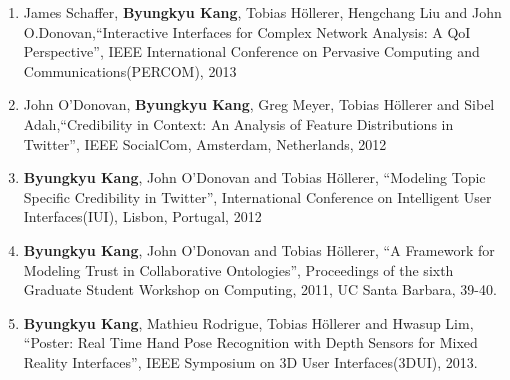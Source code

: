 \documentclass[10pt]{article}
\makeatletter
\newlength{\bibhang}
\newlength{\bibsep}
 {\@listi \global\bibsep\itemsep \global\advance\bibsep by\parsep}
\newenvironment{bibsection}%
        {\begin{enumerate}{}{%
       \setlength{\leftmargin}{\bibhang}%
       \setlength{\itemindent}{-\leftmargin}%
       \setlength{\itemsep}{\bibsep}%
       \setlength{\parsep}{\z@}%
        \setlength{\partopsep}{0pt}%
        \setlength{\topsep}{0pt}}}
        {\end{enumerate}\vspace{-.6\baselineskip}}
\makeatother
\begin{document}
\begin{bibsection}
   \item[--] James Schaffer, {\bf Byungkyu Kang}, Tobias H{\"o}llerer, Hengchang Liu and John O.Donovan,``Interactive Interfaces for Complex Network Analysis: A QoI Perspective'', IEEE International Conference on Pervasive Computing and Communications(PERCOM), 2013
   
   \item[--] John O'Donovan, {\bf Byungkyu Kang}, Greg Meyer, Tobias H{\"o}llerer and Sibel Adal\i,``Credibility in Context: An Analysis of Feature Distributions in Twitter'', IEEE SocialCom, Amsterdam, Netherlands, 2012
   
   \item[--] {\bf Byungkyu Kang}, John O'Donovan and Tobias H{\"o}llerer, ``Modeling Topic Specific Credibility in Twitter'', International Conference on Intelligent User Interfaces(IUI), Lisbon, Portugal, 2012
   
   \item[--] {\bf Byungkyu Kang}, John O'Donovan and Tobias H{\"o}llerer, ``A Framework for Modeling Trust in Collaborative Ontologies'', Proceedings of the sixth Graduate Student Workshop on Computing, 2011, UC Santa Barbara, 39-40.
   
   \item[--] {\bf Byungkyu Kang}, Mathieu Rodrigue, Tobias H{\"o}llerer and Hwasup Lim, ``Poster: Real Time Hand Pose Recognition with Depth Sensors for Mixed Reality Interfaces'', IEEE Symposium on 3D User Interfaces(3DUI), 2013.
\end{bibsection} 
\end{document}
